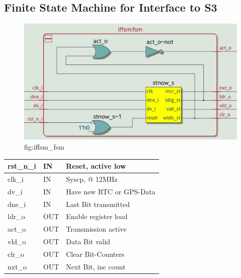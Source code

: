 \documentclass[12pt,a4 paper] {article}
\begin{document}
\subsection{Finite State Machine for Interface to S3}
\begin{figure}[h]
	\centering	
	\includegraphics[scale=0.2]{../png/iffsm_fsm.png}
	\newline
	fig:iffsm\_fsm\\
\end{figure}
\begin{center}
	\begin{tabular}{| p{2cm} | p{2cm} | p{4cm} |}
		\hline
		rst\_n\_i & IN &  Reset, active low\\
		\hline
		clk\_i   & IN  & Syscp, @ 12MHz\\
		\hline
		dv\_i    & IN  &  Have new RTC or GPS-Data\\
		\hline
		dne\_i   & IN  & Last Bit transmitted\\
		\hline
		ldr\_o   & OUT  & Enable register load\\
		\hline
		act\_o   & OUT & Transmission active\\
		\hline
		vld\_o   & OUT &  Data Bit valid\\
		\hline
		clr\_o   & OUT &  Clear Bit-Counters\\
		\hline
		nxt\_o   & OUT &  Next Bit, inc count\\
		\hline
		
	\end{tabular}
	\end{center}
\end{document}
